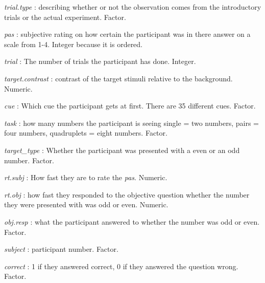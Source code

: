 \documentclass[
]{article}
\newenvironment{Shaded}{\begin{snugshade}}{\end{snugshade}}
\newcommand{\CommentTok}[1]{\textcolor[rgb]{0.56,0.35,0.01}{\textit{#1}}}
\newcommand{\FunctionTok}[1]{\textcolor[rgb]{0.00,0.00,0.00}{#1}}
\newcommand{\NormalTok}[1]{#1}
\newcommand{\OtherTok}[1]{\textcolor[rgb]{0.56,0.35,0.01}{#1}}
\newcommand{\SpecialCharTok}[1]{\textcolor[rgb]{0.00,0.00,0.00}{#1}}
\begin{document}
\emph{trial.type} : describing whether or not the observation comes from
the introductory trials or the actual experiment. Factor.

\emph{pas} : subjective rating on how certain the participant was in
there answer on a scale from 1-4. Integer because it is ordered.

\emph{trial} : The number of trials the participant has done. Integer.

\emph{target.contrast} : contrast of the target stimuli relative to the
background. Numeric.

\emph{cue} : Which cue the participant gets at first. There are 35
different cues. Factor.

\emph{task} : how many numbers the participant is seeing single = two
numbers, pairs = four numbers, quadruplets = eight numbers. Factor.

\emph{target\_type} : Whether the participant was presented with a even
or an odd number. Factor.

\emph{rt.subj} : How fast they are to rate the \emph{pas}. Numeric.

\emph{rt.obj} : how fast they responded to the objective question
whether the number they were presented with was odd or even. Numeric.

\emph{obj.resp} : what the participant answered to whether the number
was odd or even. Factor.

\emph{subject} : participant number. Factor.

\emph{correct} : 1 if they answered correct, 0 if they answered the
question wrong. Factor.

\begin{Shaded}
\end{Shaded}
\end{document}

